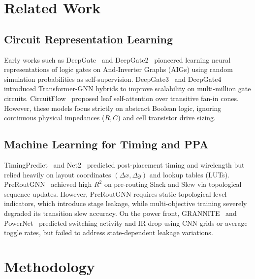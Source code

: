 \documentclass[conference]{IEEEtran}
\begin{document}
\section{Related Work}
\subsection{Circuit Representation Learning}
Early works such as DeepGate~\cite{deepgate2022} and DeepGate2~\cite{deepgate2} pioneered learning neural representations of logic gates on And-Inverter Graphs (AIGs) using random simulation probabilities as self-supervision. DeepGate3~\cite{deepgate3} and DeepGate4 introduced Transformer-GNN hybrids to improve scalability on multi-million gate circuits. CircuitFlow~\cite{circuitflow} proposed leaf self-attention over transitive fan-in cones. However, these models focus strictly on abstract Boolean logic, ignoring continuous physical impedances ($R, C$) and cell transistor drive sizing.

\subsection{Machine Learning for Timing and PPA}
TimingPredict~\cite{timingpredict} and Net2~\cite{net2} predicted post-placement timing and wirelength but relied heavily on layout coordinates $(\Delta x, \Delta y)$ and lookup tables (LUTs). PreRoutGNN~\cite{preroutgnn} achieved high $R^2$ on pre-routing Slack and Slew via topological sequence updates. However, PreRoutGNN requires static topological level indicators, which introduce stage leakage, while multi-objective training severely degraded its transition slew accuracy. On the power front, GRANNITE~\cite{grannite} and PowerNet~\cite{powernet} predicted switching activity and IR drop using CNN grids or average toggle rates, but failed to address state-dependent leakage variations.

\section{Methodology}
\end{document}
